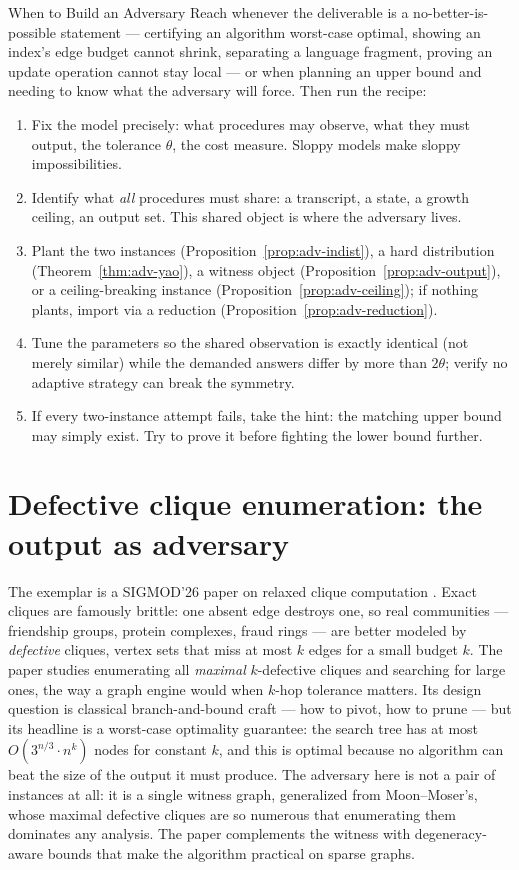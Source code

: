 \begin{reachbox}{When to Build an Adversary}
Reach whenever the deliverable is a no-better-is-possible statement --- certifying an algorithm
worst-case optimal, showing an index's edge budget cannot shrink, separating a language
fragment, proving an update operation cannot stay local --- or when planning an upper bound and
needing to know what the adversary will force. Then run the recipe:
\begin{enumerate}
\item Fix the model precisely: what procedures may observe, what they must output, the
  tolerance $\theta$, the cost measure. Sloppy models make sloppy impossibilities.
\item Identify what \emph{all} procedures must share: a transcript, a state, a growth ceiling,
  an output set. This shared object is where the adversary lives.
\item Plant the two instances (Proposition~\ref{prop:adv-indist}), a hard distribution
  (Theorem~\ref{thm:adv-yao}), a witness object
  (Proposition~\ref{prop:adv-output}), or a ceiling-breaking instance
  (Proposition~\ref{prop:adv-ceiling}); if nothing plants, import via a reduction
  (Proposition~\ref{prop:adv-reduction}).
\item Tune the parameters so the shared observation is exactly identical (not merely similar)
  while the demanded answers differ by more than $2\theta$; verify no adaptive strategy can
  break the symmetry.
\item If every two-instance attempt fails, take the hint: the matching upper bound may simply
  exist. Try to prove it before fighting the lower bound further.
\end{enumerate}
\end{reachbox}

\section{Defective clique enumeration: the output as adversary}
\label{sec:adv-defclique}

The exemplar is a SIGMOD'26 paper on relaxed clique computation \citep{sigmod26-306}. Exact
cliques are famously brittle: one absent edge destroys one, so real communities --- friendship
groups, protein complexes, fraud rings --- are better modeled by \emph{defective} cliques,
vertex sets that miss at most $k$ edges for a small budget $k$. The paper studies enumerating
all \emph{maximal} $k$-defective cliques and searching for large ones, the way a graph engine
would when $k$-hop tolerance matters. Its design question is classical branch-and-bound
craft --- how to pivot, how to prune --- but its headline is a worst-case optimality guarantee:
the search tree has at most $O(3^{n/3}\cdot n^k)$ nodes for constant $k$, and this is optimal
because no algorithm can beat the size of the output it must produce. The adversary here is not
a pair of instances at all: it is a single witness graph, generalized from Moon--Moser's, whose
maximal defective cliques are so numerous that enumerating them dominates any analysis. The
paper complements the witness with degeneracy-aware bounds that make the algorithm practical on
sparse graphs.

